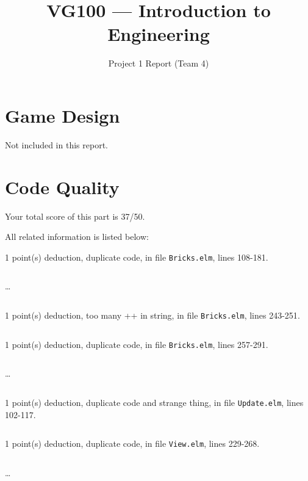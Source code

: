 \documentclass{article}
\title{VG100 --- Introduction to\\ Engineering}
\subtitle{Project 1 Report (Team 4)}
\begin{document}
\maketitle

\section{Game Design}

Not included in this report.

\section{Code Quality}

Your total score of this part is 37/50. \medskip

All related information is listed below: \medskip

1 point(s) {\color{red}deduction}, duplicate code, in file {\color{blue}\texttt{Bricks.elm}}, lines {\color{blue}108-181}.

\inputminted[firstline=108,lastline=117]{elm}{Bricks.elm}

\dots

\inputminted[firstline=172,lastline=181]{elm}{Bricks.elm}

1 point(s) {\color{red}deduction}, too many ++ in string, in file {\color{blue}\texttt{Bricks.elm}}, lines {\color{blue}243-251}.

\inputminted[firstline=243,lastline=251]{elm}{Bricks.elm}

1 point(s) {\color{red}deduction}, duplicate code, in file {\color{blue}\texttt{Bricks.elm}}, lines {\color{blue}257-291}.

\inputminted[firstline=257,lastline=266]{elm}{Bricks.elm}

\dots

\inputminted[firstline=282,lastline=291]{elm}{Bricks.elm}

1 point(s) {\color{red}deduction}, duplicate code and strange thing, in file {\color{blue}\texttt{Update.elm}}, lines {\color{blue}102-117}.

\inputminted[firstline=102,lastline=117]{elm}{Update.elm}

1 point(s) {\color{red}deduction}, duplicate code, in file {\color{blue}\texttt{View.elm}}, lines {\color{blue}229-268}.

\inputminted[firstline=229,lastline=238]{elm}{View.elm}

\dots

\inputminted[firstline=259,lastline=268]{elm}{View.elm}
\end{document}
